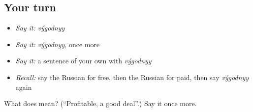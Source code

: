 \subsection*{Your turn}
\begin{itemize}
\raggedright
  \item \emph{Say it:} \emph{výgodnyy}
  \item \emph{Say it:} \emph{výgodnyy}, once more
  \item \emph{Say it:} a sentence of your own with \emph{výgodnyy}
  \item \emph{Recall:} say the Russian for free, then the Russian for paid, then say \emph{výgodnyy} again
\end{itemize}

\begin{tcolorbox}[breakable,colback=teal!4,colframe=teal!35!black,title={Before you move on}]
What does  mean? (\textquotedblleft{}Profitable, a good deal\textquotedblright{}.) Say it once more.
\end{tcolorbox}
